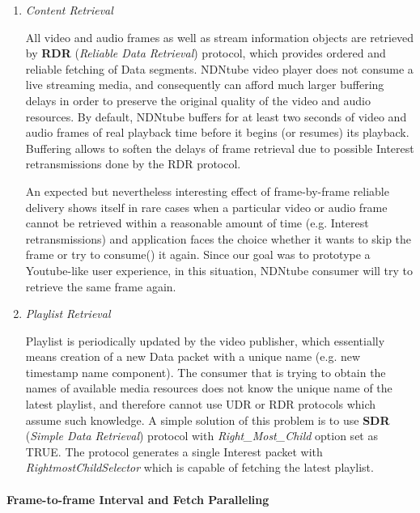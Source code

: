 \begin{enumerate}
	\item {\textit{Content Retrieval}}
	
All video and audio frames as well as stream information objects are retrieved by \textbf{RDR} (\textit{Reliable Data Retrieval}) protocol, which provides ordered and reliable fetching of Data segments. NDNtube video player does not consume a live streaming media, and consequently can afford much larger buffering delays in order to preserve the original quality of the video and audio resources. By default, NDNtube buffers for at least two seconds of video and audio frames of real playback time before it begins (or resumes) its playback. Buffering allows to soften the delays of frame retrieval due to possible Interest retransmissions done by the RDR protocol. 

An expected but nevertheless interesting effect of frame-by-frame reliable delivery shows itself in rare cases when a particular video or audio frame cannot be retrieved within a reasonable amount of time (e.g. Interest retransmissions) and application faces the choice whether it wants to skip the frame or try to consume() it again. Since our goal was to prototype a Youtube-like user experience, in this situation, NDNtube consumer will try to retrieve the same frame again. 

	\item {\textit{Playlist Retrieval}} 
	
Playlist is periodically updated by the video publisher, which essentially means creation of a new Data packet with a unique name (e.g. new timestamp name component). The consumer that is trying to obtain the names of available media resources does not know the unique name of the latest playlist, and therefore cannot use UDR or RDR protocols which assume such knowledge. A simple solution of this problem is to use  \textbf{SDR} (\textit{Simple Data Retrieval}) protocol with \textit{Right\_Most\_Child} option set as TRUE. The protocol generates a single Interest packet with \textit{RightmostChildSelector} which is capable of fetching the latest playlist. 

\end{enumerate}

\paragraph{Frame-to-frame Interval and Fetch Paralleling} 

